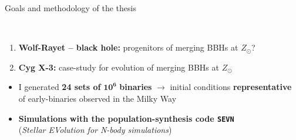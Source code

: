 \documentclass{beamer} %
\begin{document}
\begin{frame}{Goals and methodology of the thesis}
	\small
	
	\\
	\begin{enumerate}		
		\item \textbf{Wolf-Rayet -- black hole:} progenitors of merging BBHs at $Z_\odot$?
		\item \textbf{Cyg X-3:} case-study for evolution of merging BBHs at $Z_\odot$
	\end{enumerate}

	\bigskip
	\bigskip
	\centering
	\flushleft
	\bigskip
	\medskip

	\begin{itemize}
		\item I generated \textbf{24 sets of} $\textbf{10}^{\textbf{6}}$ \textbf{binaries} $\rightarrow$ initial conditions \textbf{representative} of early-binaries observed in the Milky Way\\
		\medskip
		\item \textbf{Simulations with the population-synthesis code \texttt{SEVN}} \\
		(\emph{Stellar EVolution for N-body simulations})\\
	\end{itemize}
\end{frame}
\end{document}
